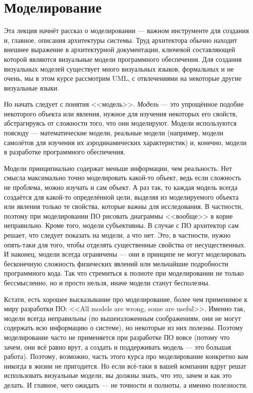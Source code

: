 \documentclass{../../text-style}
\begin{document}
\maketitle
\thispagestyle{empty}

\section{Моделирование}

Эта лекция начнёт рассказ о моделировании --- важном инструменте для создания и, главное, описания архитектуры системы. Труд архитектора обычно находит внешнее выражение в архитектурной документации, ключевой составляющей которой являются визуальные модели программного обеспечения. Для создания визуальных моделей существует много визуальных языков, формальных и не очень, мы в этом курсе рассмотрим UML, с отвлечениями на некоторые другие визуальные языки.

Но начать следует с понятия <<модель>>. \textit{Модель} --- это упрощённое подобие некоторого объекта или явления, нужное для изучения некоторых его свойств, абстрагируясь от сложности того, что они моделируют. Модели используются повсюду --- математические модели, реальные модели (например, модели самолётов для изучения их аэродинамических характеристик) и, конечно, модели в разработке программного обеспечения.

Модели принципиально содержат меньше информации, чем реальность. Нет смысла максимально точно моделировать какой-то объект, ведь если сложность не проблема, можно изучать и сам объект. А раз так, то каждая модель всегда создаётся для какой-то определённой цели, выделяя из моделируемого объекта или явления только те свойства, которые важны для исследования. В частности, поэтому при моделировании ПО рисовать диаграммы <<вообще>> в корне неправильно. Кроме того, модели субъективны. В случае с ПО архитектор сам решает, что следует показать на модели, а что нет. Это, в частности, нужно опять-таки для того, чтобы отделять существенные свойства от несущественных. И наконец, модели всегда ограничены --- они в принципе не могут моделировать бесконечную сложность физических явлений или мельчайшие подробности программного кода. Так что стремиться к полноте при моделировании не только бессмысленно, но и просто нельзя, иначе модели станут бесполезны.

Кстати, есть хорошее высказывание про моделирование, более чем применимое к миру разработки ПО: <<All models are wrong, some are useful>>. Именно так, модели всегда неправильны (по вышеизложенным соображениям, они не могут содержать всю информацию о системе), но некоторые из них полезны. Поэтому моделирование часто не применяется при разработке ПО вовсе (потому что зачем, они всё равно врут, а создать и поддерживать модель --- это большая работа). Поэтому, возможно, часть этого курса про моделирование конкретно вам никогда в жизни не пригодится. Но если всё-таки в вашей компании вдруг решат использовать визуальные модели, вы должны знать, что это, зачем и как это делать. И главное, чего ожидать --- не точности и полноты, а именно полезности.
\end{document}
